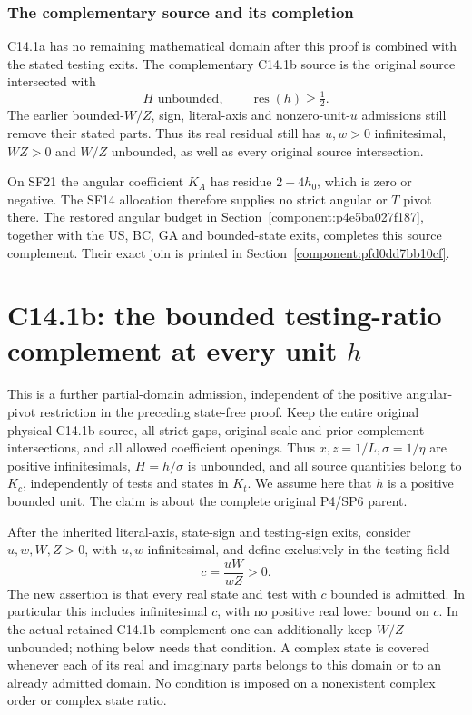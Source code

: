\subsubsection*{The complementary source and its completion}

C14.1a has no remaining mathematical domain after this proof is
combined with the stated testing exits. The complementary C14.1b
source is the original source intersected with
\[
 H\text{ unbounded},\qquad \operatorname{res}(h)\ge\tfrac12.
 \tag{SF21}
\]
The earlier bounded-$W/Z$, sign, literal-axis and nonzero-unit-$u$
admissions still remove their stated parts. Thus its real residual
still has $u,w>0$ infinitesimal, $WZ>0$ and $W/Z$ unbounded,
as well as every original source intersection.

On SF21 the angular coefficient $K_A$ has residue $2-4h_0$, which is zero or negative. The SF14 allocation therefore supplies no strict angular or $T$ pivot there. The restored angular budget in Section~\ref{component:p4e5ba027f187}, together with the US, BC, GA and bounded-state exits, completes this source complement. Their exact join is printed in Section~\ref{component:pfd0dd7bb10cf}.




\section{\texorpdfstring{C14.1b: the bounded testing-ratio complement at every unit $h$}{C14.1b: the bounded testing-ratio complement at every unit h}}
\label{component:p5cd5fa89abcc}

\label{p5cd5fa89abcc:sec:c141b-bounded-testing-ratio}

This is a further partial-domain admission, independent of the positive
angular-pivot restriction in the preceding state-free proof. Keep the
entire original physical C14.1b source, all strict gaps, original scale
and prior-complement intersections, and all allowed coefficient openings.
Thus $x,z=1/L,\sigma=1/\eta$ are positive infinitesimals, $H=h/\sigma$
is unbounded, and all source quantities belong to $K_c$, independently
of tests and states in $K_t$. We assume here that $h$ is a positive
bounded unit. The claim is about the complete original P4/SP6 parent.

After the inherited literal-axis, state-sign and testing-sign exits,
consider $u,w,W,Z>0$, with $u,w$ infinitesimal, and define exclusively
in the testing field
\[
                 c=\frac{uW}{wZ}>0.
                 \tag{BC1}
\]
The new assertion is that every real state and test with $c$ bounded
is admitted. In particular this includes infinitesimal $c$, with no
positive real lower bound on $c$. In the actual retained C14.1b
complement one can additionally keep $W/Z$ unbounded; nothing below
needs that condition. A complex state is covered whenever each of its
real and imaginary parts belongs to this domain or to an already
admitted domain. No condition is imposed on a nonexistent complex
order or complex state ratio.

